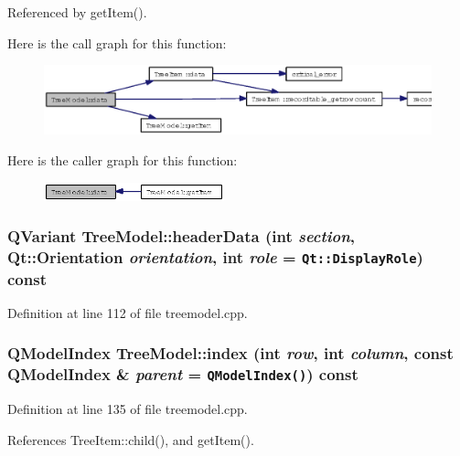 Referenced by get\-Item().

Here is the call graph for this function:\begin{figure}[H]
\begin{center}
\leavevmode
\includegraphics[width=344pt]{classTreeModel_986b92267ac9cdc90519c10404192bbd_cgraph}
\end{center}
\end{figure}


Here is the caller graph for this function:\begin{figure}[H]
\begin{center}
\leavevmode
\includegraphics[width=148pt]{classTreeModel_986b92267ac9cdc90519c10404192bbd_icgraph}
\end{center}
\end{figure}
\subsubsection{\setlength{\rightskip}{0pt plus 5cm}QVariant Tree\-Model::header\-Data (int {\em section}, Qt::Orientation {\em orientation}, int {\em role} = {\tt Qt::DisplayRole}) const}\label{classTreeModel_59b8e296fb38595cd5459aa75dd507ba}




Definition at line 112 of file treemodel.cpp.
\subsubsection{\setlength{\rightskip}{0pt plus 5cm}QModel\-Index Tree\-Model::index (int {\em row}, int {\em column}, const QModel\-Index \& {\em parent} = {\tt QModelIndex()}) const}\label{classTreeModel_0e6e6bbdb55d08be64cab7bafba2ce21}




Definition at line 135 of file treemodel.cpp.

References Tree\-Item::child(), and get\-Item().

